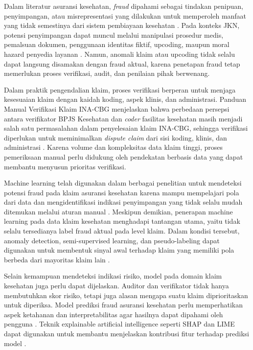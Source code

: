 Dalam literatur asuransi kesehatan, \textit{fraud} dipahami sebagai tindakan penipuan, penyimpangan, atau misrepresentasi yang dilakukan untuk memperoleh manfaat yang tidak semestinya dari sistem pembiayaan kesehatan \citep{villegas2021,timofeyev2022}. Pada konteks JKN, potensi penyimpangan dapat muncul melalui manipulasi prosedur medis, pemalsuan dokumen, penggunaan identitas fiktif, upcoding, maupun moral hazard penyedia layanan \citep{nurlianti2025,muliarta2023,syafrawati2023}. Namun, anomali klaim atau upcoding tidak selalu dapat langsung disamakan dengan fraud aktual, karena penetapan fraud tetap memerlukan proses verifikasi, audit, dan penilaian pihak berwenang.

Dalam praktik pengendalian klaim, proses verifikasi berperan untuk menjaga kesesuaian klaim dengan kaidah koding, aspek klinis, dan administrasi. Panduan Manual Verifikasi Klaim INA-CBG menjelaskan bahwa perbedaan persepsi antara verifikator BPJS Kesehatan dan \textit{coder} fasilitas kesehatan masih menjadi salah satu permasalahan dalam penyelesaian klaim INA-CBG, sehingga verifikasi diperlukan untuk meminimalkan \textit{dispute claim} dari sisi koding, klinis, dan administrasi \citep{bpjs2018}. Karena volume dan kompleksitas data klaim tinggi, proses pemeriksaan manual perlu didukung oleh pendekatan berbasis data yang dapat membantu menyusun prioritas verifikasi.

Machine learning telah digunakan dalam berbagai penelitian untuk mendeteksi potensi fraud pada klaim asuransi kesehatan karena mampu mempelajari pola dari data dan mengidentifikasi indikasi penyimpangan yang tidak selalu mudah ditemukan melalui aturan manual \citep{nabrawi2023,hamid2024,curtis2025}. Meskipun demikian, penerapan machine learning pada data klaim kesehatan menghadapi tantangan utama, yaitu tidak selalu tersedianya label fraud aktual pada level klaim. Dalam kondisi tersebut, anomaly detection, semi-supervised learning, dan pseudo-labeling dapat digunakan untuk membentuk sinyal awal terhadap klaim yang memiliki pola berbeda dari mayoritas klaim lain \citep{shekhar2023,settipalli2023,meulemeester2025,bakker2025,lee2013}.

Selain kemampuan mendeteksi indikasi risiko, model pada domain klaim kesehatan juga perlu dapat dijelaskan. Auditor dan verifikator tidak hanya membutuhkan skor risiko, tetapi juga alasan mengapa suatu klaim diprioritaskan untuk diperiksa. Model prediksi fraud asuransi kesehatan perlu memperhatikan aspek ketahanan dan interpretabilitas agar hasilnya dapat dipahami oleh pengguna \citep{wang2025}. Teknik explainable artificial intelligence seperti SHAP dan LIME dapat digunakan untuk membantu menjelaskan kontribusi fitur terhadap prediksi model \citep{ribeiro2016,lundberg2017,salih2025}.

